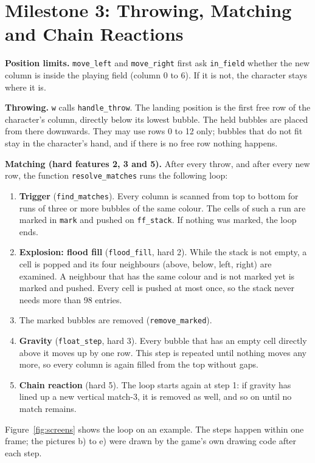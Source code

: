 \documentclass[11pt]{article}
\newcommand{\code}[1]{\texttt{#1}}
\begin{document}
\section{Milestone 3: Throwing, Matching and Chain Reactions}
\label{sec:m3}

\textbf{Position limits.} \code{move\_left} and \code{move\_right} first ask
\code{in\_field} whether the new column is inside the playing field (column 0
to 6). If it is not, the character stays where it is.

\textbf{Throwing.} \code{w} calls \code{handle\_throw}. The landing position
is the first free row of the character's column, directly below its lowest
bubble. The held bubbles are placed from there downwards. They may use rows 0
to 12 only; bubbles that do not fit stay in the character's hand, and if
there is no free row nothing happens.

\textbf{Matching (hard features 2, 3 and 5).} After every throw, and after
every new row, the function \code{resolve\_matches} runs the following
loop:

\begin{enumerate}[nosep]
\item \textbf{Trigger} (\code{find\_matches}). Every column is scanned from
top to bottom for runs of three or more bubbles of the same colour. The cells
of such a run are marked in \code{mark} and pushed on \code{ff\_stack}. If
nothing was marked, the loop ends.
\item \textbf{Explosion: flood fill} (\code{flood\_fill}, hard 2). While the
stack is not empty, a cell is popped and its four neighbours (above, below,
left, right) are examined. A neighbour that has the same colour and is not
marked yet is marked and pushed. Every cell is pushed at most once, so the
stack never needs more than 98 entries.
\item The marked bubbles are removed (\code{remove\_marked}).
\item \textbf{Gravity} (\code{float\_step}, hard 3). Every bubble that has an
empty cell directly above it moves up by one row. This step is repeated until
nothing moves any more, so every column is again filled from the top without
gaps.
\item \textbf{Chain reaction} (hard 5). The loop starts again at step 1:
if gravity has lined up a new vertical match-3, it is removed as well, and
so on until no match remains.
\end{enumerate}

Figure~\ref{fig:screens} shows the loop on an example. The steps happen
within one frame; the pictures b) to e) were drawn by the game's own drawing
code after each step.
\end{document}
